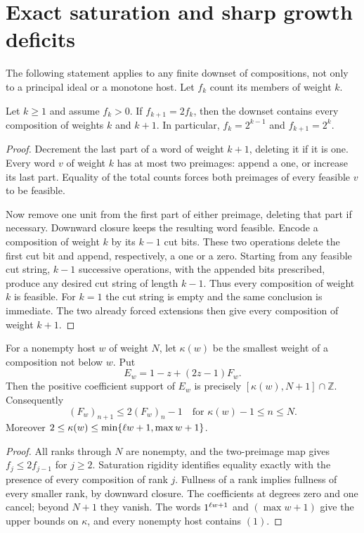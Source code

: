 \section{Exact saturation and sharp growth deficits}\label{sec:saturation}

The following statement applies to any finite downset of compositions,
not only to a principal ideal or a monotone host. Let $f_k$ count its
members of weight $k$.

\begin{theorem}
Let $k\ge1$ and assume $f_k>0$. If $f_{k+1}=2f_k$, then the downset
contains every composition of weights $k$ and $k+1$. In particular,
$f_k=2^{k-1}$ and $f_{k+1}=2^k$.
\end{theorem}

\begin{proof}
Decrement the last part of a word of weight $k+1$, deleting it if it is
one. Every word $v$ of weight $k$ has at most two preimages: append a
one, or increase its last part. Equality of the total counts forces
both preimages of every feasible $v$ to be feasible.

Now remove one unit from the first part of either preimage, deleting
that part if necessary. Downward closure keeps the resulting word
feasible. Encode a composition of weight $k$ by its $k-1$ cut bits.
These two operations delete the first cut bit and append, respectively,
a one or a zero. Starting from any feasible cut string, $k-1$ successive
operations, with the appended bits prescribed, produce any desired cut
string of length $k-1$. Thus every composition of weight $k$ is feasible.
For $k=1$ the cut string is empty and the same conclusion is immediate.
The two already forced extensions then give every composition of
weight $k+1$.
\end{proof}

\begin{corollary}
For a nonempty host $w$ of weight $N$, let $\kappa(w)$ be the smallest
weight of a composition not below $w$. Put
\[
 E_w=1-z+(2z-1)F_w.
\]
Then the positive coefficient support of $E_w$ is precisely
$[\kappa(w),N+1]\cap\mathbb Z$. Consequently
\[
 (F_w)_{n+1}\le2(F_w)_n-1
 \quad\text{for }\kappa(w)-1\le n\le N.
\]
Moreover $2\le\kappa(w)\le\min\{\ell w+1,\max w+1\}$.
\end{corollary}

\begin{proof}
All ranks through $N$ are nonempty, and the two-preimage map gives
$f_{j}\le2f_{j-1}$ for $j\ge2$. Saturation rigidity identifies equality
exactly with the presence of every composition of rank $j$. Fullness
of a rank implies fullness of every smaller rank, by downward closure.
The coefficients at degrees zero and one cancel; beyond $N+1$ they
vanish. The words $1^{\ell w+1}$ and $(\max w+1)$ give the upper bounds
on $\kappa$, and every nonempty host contains $(1)$.
\end{proof}

